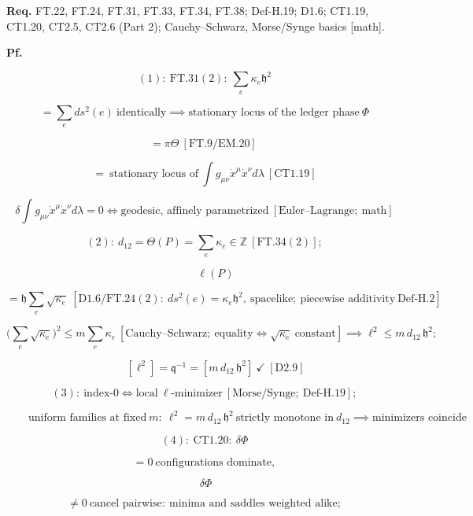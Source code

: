 \begin{theorem}
\textbf{Req.} FT.22, FT.24, FT.31, FT.33, FT.34, FT.38; Def-H.19; D1.6; CT1.19, CT1.20, CT2.5, CT2.6 (Part 2); Cauchy–Schwarz, Morse/Synge basics [math].

\textbf{Pf.}

\[
(1):\ \mathrm{FT.31}(2):\ \sum_e\kappa_e\mathfrak h^2
\]

\[
= \sum_e ds^2(e)\ \text{identically}\implies\text{stationary locus of the ledger phase}\ \Phi
\]

\[
= \pi\Theta\ [\mathrm{FT.9}/\mathrm{EM.20}]\
\]

\[
= \ \text{stationary locus of}\ \textstyle\int g_{\mu\nu}\dot x^\mu\dot x^\nu d\lambda\ [\mathrm{CT1.19}]
\]

\[
\delta\!\int g_{\mu\nu}\dot x^\mu\dot x^\nu d\lambda=0\iff\text{geodesic, affinely parametrized}\ [\text{Euler–Lagrange};\ \text{math}]
\]

\[
(2):\ d_{12}=\Theta(P)=\sum_e\kappa_e\in\mathbb Z\ [\mathrm{FT.34}(2)];
\]

\[
\qquad \ell(P)
\]

\[
= \mathfrak h\sum_e\sqrt{\kappa_e}\ [\mathrm{D1.6}/\mathrm{FT.24}(2):\ ds^2(e)=\kappa_e\mathfrak h^2,\ \text{spacelike};\ \text{piecewise additivity}\ \mathrm{Def\text{-}H.2}]
\]

\[
\bigl(\textstyle\sum_e\sqrt{\kappa_e}\bigr)^2\le m\sum_e\kappa_e\ [\text{Cauchy–Schwarz};\ \text{equality}\iff\sqrt{\kappa_e}\ \text{constant}]\implies\ell^2\le m\,d_{12}\,\mathfrak h^2;
\]

\[
\qquad [\ell^2]=\mathfrak q^{-1}=[m\,d_{12}\,\mathfrak h^2]\ \checkmark\ [\mathrm{D2.9}]
\]

\[
(3):\ \text{index-0}\iff\text{local}\ \ell\text{-minimizer}\ [\text{Morse/Synge};\ \mathrm{Def\text{-}H.19}];
\]

\[
\qquad \text{uniform families at fixed}\ m:\ \ell^2=m\,d_{12}\,\mathfrak h^2\ \text{strictly monotone in}\ d_{12}\implies\text{minimizers coincide}
\]

\[
(4):\ \mathrm{CT1.20}:\ \delta\Phi
\]

\[
= 0\ \text{configurations dominate},
\]

\[
\ \delta\Phi
\]

\[
\ne 0\ \text{cancel pairwise}:\ \text{minima and saddles weighted alike};
\]


\end{theorem}
